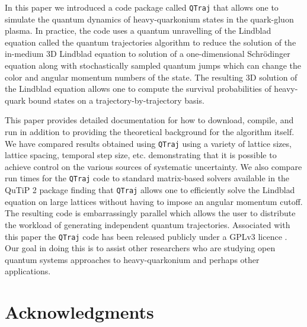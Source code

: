 \documentclass[times,sort&compress,final]{elsarticle}
\def\qtraj{{\tt QTraj} }
\begin{document}
In this paper we introduced a code package called \qtraj that allows one to simulate the quantum dynamics of heavy-quarkonium states in the quark-gluon plasma.  In practice, the code uses a quantum unravelling of the Lindblad equation called the quantum trajectories algorithm to reduce the solution of the in-medium 3D Lindblad equation to solution of a one-dimensional Schr\"odinger equation along with stochastically sampled quantum jumps which can change the color and angular momentum numbers of the state.  The resulting 3D solution of the Lindblad equation allows one to compute the survival probabilities of heavy-quark bound states on a trajectory-by-trajectory basis.

This paper provides detailed documentation for how to download, compile, and run in addition to providing the theoretical background for the algorithm itself.  We have compared results obtained using \qtraj using a variety of lattice sizes, lattice spacing, temporal step size, etc. demonstrating that it is possible to achieve control on the various sources of systematic uncertainty.  We also compare run times for the \qtraj code to standard matrix-based solvers available in the QuTiP 2 package finding that \qtraj allows one to efficiently solve the Lindblad equation on large lattices without having to impose an angular momentum cutoff.  The resulting code is embarrassingly parallel which allows the user to distribute the workload of generating independent quantum trajectories.  Associated with this paper the \qtraj code has been released publicly under a GPLv3 licence \cite{qtraj-download}.  Our goal in doing this is to assist other researchers who are studying open quantum systems approaches to heavy-quarkonium and perhaps other applications.

\section*{Acknowledgments}
\end{document}

